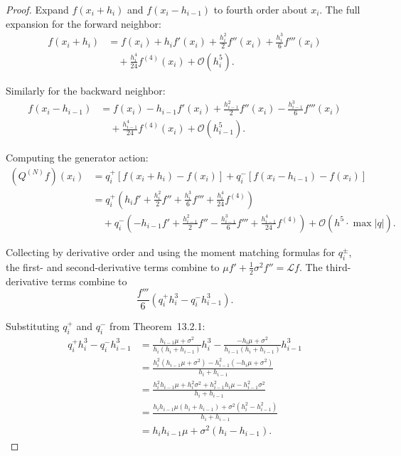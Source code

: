 \documentclass[11pt,a4paper,openany]{book}
\theoremstyle{definition}
\theoremstyle{plain}
\theoremstyle{remark}
\newcommand{\1}{\mathbbm{1}}
\newcommand{\calL}{\mathcal{L}}
\begin{document}
\begin{proof}
Expand $f(x_{i} + h_{i})$ and $f(x_{i} - h_{i-1})$ to fourth order about $x_{i}$. The full expansion for the forward neighbor:
\[
\begin{aligned}
f(x_{i} + h_{i}) &= f(x_{i}) + h_{i} f'(x_{i}) + \frac{h_{i}^{2}}{2} f''(x_{i}) + \frac{h_{i}^{3}}{6} f'''(x_{i}) \\
&\quad + \frac{h_{i}^{4}}{24} f^{(4)}(x_{i}) + \mathcal{O}(h_{i}^{5}).
\end{aligned}
\]

Similarly for the backward neighbor:
\[
\begin{aligned}
f(x_{i} - h_{i-1}) &= f(x_{i}) - h_{i-1} f'(x_{i}) + \frac{h_{i-1}^{2}}{2} f''(x_{i}) - \frac{h_{i-1}^{3}}{6} f'''(x_{i}) \\
&\quad + \frac{h_{i-1}^{4}}{24} f^{(4)}(x_{i}) + \mathcal{O}(h_{i-1}^{5}).
\end{aligned}
\]

Computing the generator action:
\[
\begin{aligned}
(Q^{(N)} f)(x_{i}) &= q_{i}^{+}[f(x_{i}+h_{i}) - f(x_{i})] + q_{i}^{-}[f(x_{i}-h_{i-1}) - f(x_{i})] \\
&= q_{i}^{+} \left(h_{i} f' + \frac{h_{i}^{2}}{2} f'' + \frac{h_{i}^{3}}{6} f''' + \frac{h_{i}^{4}}{24} f^{(4)}\right) \\
&\quad + q_{i}^{-} \left(-h_{i-1} f' + \frac{h_{i-1}^{2}}{2} f'' - \frac{h_{i-1}^{3}}{6} f''' + \frac{h_{i-1}^{4}}{24} f^{(4)}\right) + \mathcal{O}(h^{5} \cdot \max|q|).
\end{aligned}
\]

Collecting by derivative order and using the moment matching formulas for $q_{i}^{\pm}$, the first- and second-derivative terms combine to $\mu f' + \frac{1}{2} \sigma^{2} f'' = \calL f$. The third-derivative terms combine to
\[
\frac{f'''}{6} \left(q_{i}^{+} h_{i}^{3} - q_{i}^{-} h_{i-1}^{3}\right).
\]

Substituting $q_{i}^{+}$ and $q_{i}^{-}$ from Theorem~13.2.1:
\[
\begin{aligned}
q_{i}^{+} h_{i}^{3} - q_{i}^{-} h_{i-1}^{3} &= \frac{h_{i-1}\mu + \sigma^{2}}{h_{i}(h_{i}+h_{i-1})} h_{i}^{3} - \frac{-h_{i}\mu + \sigma^{2}}{h_{i-1}(h_{i}+h_{i-1})} h_{i-1}^{3} \\
&= \frac{h_{i}^{2}(h_{i-1}\mu + \sigma^{2}) - h_{i-1}^{2}(-h_{i}\mu + \sigma^{2})}{h_{i} + h_{i-1}} \\
&= \frac{h_{i}^{2} h_{i-1} \mu + h_{i}^{2} \sigma^{2} + h_{i-1}^{2} h_{i} \mu - h_{i-1}^{2} \sigma^{2}}{h_{i} + h_{i-1}} \\
&= \frac{h_{i} h_{i-1} \mu (h_{i} + h_{i-1}) + \sigma^{2} (h_{i}^{2} - h_{i-1}^{2})}{h_{i} + h_{i-1}} \\
&= h_{i} h_{i-1} \mu + \sigma^{2} (h_{i} - h_{i-1}).
\end{aligned}
\]


\end{proof}
\end{document}
